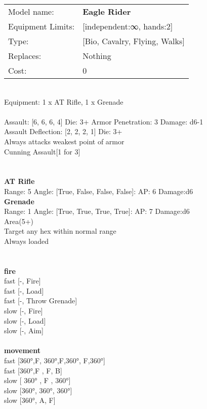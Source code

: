 \noindent
\begin{tabular}{ll}
Model name: &{\bf Eagle Rider } \\
Equipment Limits: &[independent:∞, hands:2] \\
Type: &[Bio, Cavalry, Flying, Walks] \\
Replaces: &Nothing \\
Cost: & 0\\
\end{tabular}
\ \\
Equipment: 1 x AT Rifle, 1 x Grenade \\
\ \\
Assault: [6, 6, 6, 4] Die: 3+ Armor Penetration: 3 Damage: d6-1 \\
Assault Deflection: [2, 2, 2, 1] Die: 3+\\
\indent Always attacks weakest point of armor\\ 
Cunning Assault[1 for 3]\\ 
 
\ \\

\ \\
{\bf AT Rifle } \\



Range: 5  Angle: [True, False, False, False]: AP: 6 Damage:d6 \\




{\bf Grenade } \\



Range: 1  Angle: [True, True, True, True]: AP: 7 Damage:d6 \\
Area(5+)\\ 
Target any hex within normal range\\ 
Always loaded\\ 




 
\ \\



\ \\ {\bf fire } \\
fast [-, Fire] \\
fast [-, Load] \\
fast [-, Throw Grenade] \\
slow [-, Fire] \\
slow [-, Load] \\
slow [-, Aim] \\
\ \\ {\bf movement } \\
fast [360°,F, 360°,F,360°, F,360°] \\
fast [360°,F , F, B] \\
slow [ 360° ,  F ,  360°] \\
slow [360°, 360°, 360°] \\
slow [360°, A, F] \\



